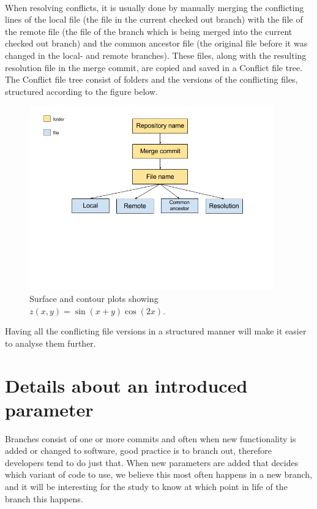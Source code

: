 \paragraph*{}
When resolving conflicts, it is usually done by manually merging the conflicting lines of the local file (the file in the current checked out branch) with the file of the remote file (the file of the branch which is being merged into the current checked out branch) and the common ancestor file (the original file before it was changed in the local- and remote branches). These files, along with the resulting resolution file in the merge commit, are copied and saved in a Conflict file tree. The Conflict file tree consist of folders and the versions of the conflicting files, structured according to the figure below.\\
\begin{figure}[H]
\centering
\includegraphics[width=400]{figure/conflicts.png}
\caption{Surface and contour plots showing $z(x,y)=\sin(x+y)\cos(2x)$.}
\end{figure}

Having all the conflicting file versions in a structured manner will make it easier to analyse them further.
\section{Details about an introduced parameter}
Branches consist of one or more commits and often when new functionality is added or changed to software, good practice is to branch out, therefore developers tend to do just that. When new parameters are added that decides which variant of code to use, we believe this most often happens in a new branch, and it will be interesting for the study to know at which point in life of the branch this happens.

